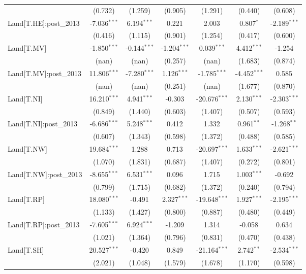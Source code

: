 \begin{table}[!htbp]
\begin{tabular}{@{\extracolsep{5pt}}lcccccc}
  & (0.732) & (1.259) & (0.905) & (1.291) & (0.440) & (0.608) \\
 Land[T.HE]:post_2013 & -7.036$^{***}$ & 6.194$^{***}$ & 0.221$^{}$ & 2.003$^{}$ & 0.807$^{*}$ & -2.189$^{***}$ \\
  & (0.416) & (1.115) & (0.901) & (1.254) & (0.417) & (0.600) \\
 Land[T.MV] & -1.850$^{***}$ & -0.144$^{***}$ & -1.204$^{***}$ & 0.039$^{***}$ & 4.412$^{***}$ & -1.254$^{}$ \\
  & (nan) & (nan) & (0.257) & (nan) & (1.683) & (0.874) \\
 Land[T.MV]:post_2013 & 11.806$^{***}$ & -7.280$^{***}$ & 1.126$^{***}$ & -1.785$^{***}$ & -4.452$^{***}$ & 0.585$^{}$ \\
  & (nan) & (nan) & (0.251) & (nan) & (1.677) & (0.870) \\
 Land[T.NI] & 16.210$^{***}$ & 4.941$^{***}$ & -0.303$^{}$ & -20.676$^{***}$ & 2.130$^{***}$ & -2.303$^{***}$ \\
  & (0.849) & (1.440) & (0.603) & (1.407) & (0.507) & (0.593) \\
 Land[T.NI]:post_2013 & -6.686$^{***}$ & 5.248$^{***}$ & 0.412$^{}$ & 1.332$^{}$ & 0.961$^{**}$ & -1.268$^{**}$ \\
  & (0.607) & (1.343) & (0.598) & (1.372) & (0.488) & (0.585) \\
 Land[T.NW] & 19.684$^{***}$ & 1.288$^{}$ & 0.713$^{}$ & -20.697$^{***}$ & 1.633$^{***}$ & -2.621$^{***}$ \\
  & (1.070) & (1.831) & (0.687) & (1.407) & (0.272) & (0.801) \\
 Land[T.NW]:post_2013 & -8.655$^{***}$ & 6.531$^{***}$ & 0.096$^{}$ & 1.715$^{}$ & 1.003$^{***}$ & -0.692$^{}$ \\
  & (0.799) & (1.715) & (0.682) & (1.372) & (0.240) & (0.794) \\
 Land[T.RP] & 18.080$^{***}$ & -0.491$^{}$ & 2.327$^{***}$ & -19.648$^{***}$ & 1.927$^{***}$ & -2.195$^{***}$ \\
  & (1.133) & (1.427) & (0.800) & (0.887) & (0.480) & (0.449) \\
 Land[T.RP]:post_2013 & -7.605$^{***}$ & 6.924$^{***}$ & -1.209$^{}$ & 1.314$^{}$ & -0.058$^{}$ & 0.634$^{}$ \\
  & (1.021) & (1.364) & (0.796) & (0.831) & (0.470) & (0.438) \\
 Land[T.SH] & 20.527$^{***}$ & -0.420$^{}$ & 0.849$^{}$ & -21.164$^{***}$ & 2.742$^{**}$ & -2.534$^{***}$ \\
  & (2.021) & (1.048) & (1.579) & (1.678) & (1.170) & (0.598) \\

\end{tabular}
\end{table}
